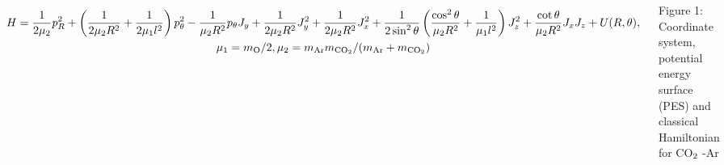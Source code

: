 \documentclass[
  20pt,
  a0paper,
  portrait,
  margin=0mm,
  innermargin=15mm,
  blockverticalspace=0mm,
  colspace=0mm,
  subcolspace=0mm
]{tikzposter}
\newcommand{\lb}{\left(}
\newcommand{\rb}{\right)}
\begin{document}
\begin{columns}
{{\begin{minipage}{0.4\linewidth}
\begin{tikzfigure}
	\includegraphics[width=0.75\linewidth]{../pictures/potential/potential_dpi.pdf}
	\label{fig:potential}
\end{tikzfigure}
\end{minipage}
\vspace*{-1cm}
\begin{gather}
H = \frac{1}{2 \mu_2} p_R^2 + \lb \frac{1}{2 \mu_2 R^2} + \frac{1}{2 \mu_1 l^2} \rb p_\theta^2 - \frac{1}{\mu_2 R^2} p_\theta J_y + \frac{1}{2 \mu_2 R^2} J_y^2 + \frac{1}{2 \mu_2 R^2} J_x^2 + \frac{1}{2 \sin^2 \theta} \lb \frac{\cos^2 \theta}{\mu_2 R^2} + \frac{1}{\mu_1 l^2} \rb J_z^2 
+ \frac{\cot \theta}{\mu_2 R^2} J_x J_z + U(R, \theta), \notag \\
\mu_1 = m_{\textup{O}} / 2, \mu_2 = m_{\textup{Ar}} m_{\textup{CO}_2} / (m_{\textup{Ar}} + m_{\textup{CO}_2}) \notag
\end{gather}
\begin{center}
Figure 1: Coordinate system, potential energy surface (PES) and classical Hamiltonian for CO$_2 \hspace{0.1cm}$-Ar
\end{center}

}}
\end{columns}
\end{document}
